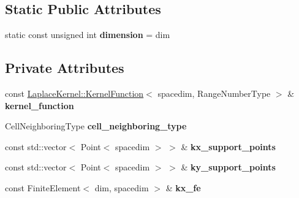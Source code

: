 \subsection*{Static Public Attributes}
\begin{DoxyCompactItemize}
\item 
\mbox{\label{classLaplaceBEM_1_1KernelPulledbackToUnitCell_a03ac8378093fac9ad01272ef619aa26e}} 
static const unsigned int {\bfseries dimension} = dim
\end{DoxyCompactItemize}
\subsection*{Private Attributes}
\begin{DoxyCompactItemize}
\item 
\mbox{\label{classLaplaceBEM_1_1KernelPulledbackToUnitCell_acf7e47b2ed819a2c6f320a306a2689fe}} 
const \hyperlink{classLaplaceBEM_1_1LaplaceKernel_1_1KernelFunction}{Laplace\+Kernel\+::\+Kernel\+Function}$<$ spacedim, Range\+Number\+Type $>$ \& {\bfseries kernel\+\_\+function}
\item 
\mbox{\label{classLaplaceBEM_1_1KernelPulledbackToUnitCell_a82662fdd33ceb50cd40aaf7b2bd1b32a}} 
Cell\+Neighboring\+Type {\bfseries cell\+\_\+neighboring\+\_\+type}
\item 
\mbox{\label{classLaplaceBEM_1_1KernelPulledbackToUnitCell_ac7667f6cacebaed1a6ba39d67211db04}} 
const std\+::vector$<$ Point$<$ spacedim $>$ $>$ \& {\bfseries kx\+\_\+support\+\_\+points}
\item 
\mbox{\label{classLaplaceBEM_1_1KernelPulledbackToUnitCell_a92971044a5f8ce2f61688858a3deac8e}} 
const std\+::vector$<$ Point$<$ spacedim $>$ $>$ \& {\bfseries ky\+\_\+support\+\_\+points}
\item 
\mbox{\label{classLaplaceBEM_1_1KernelPulledbackToUnitCell_a0455971a463de57f21930bb134461a17}} 
const Finite\+Element$<$ dim, spacedim $>$ \& {\bfseries kx\+\_\+fe}
\item 

\end{DoxyCompactItemize}
